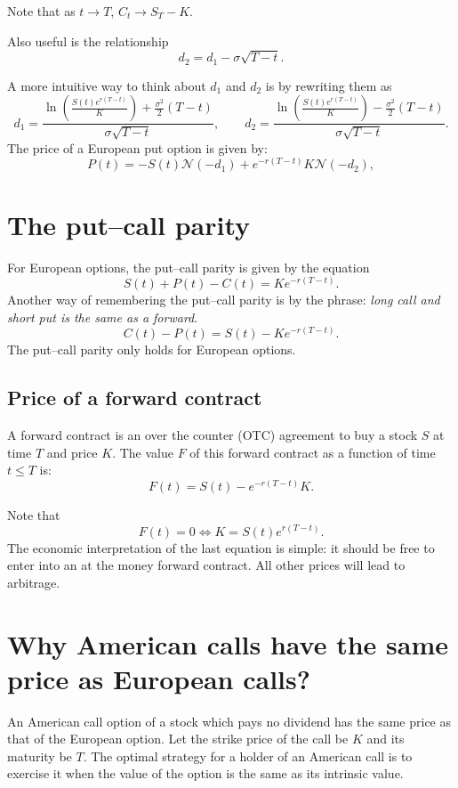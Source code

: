 \documentclass{amsart}
\theoremstyle{plain}
\numberwithin{equation}{section}
\begin{document}
Note that as $t \to T$, $C_t \to S_T - K$. 

Also useful is the relationship
\begin{equation}
d_2 = d_1 - \sigma \sqrt{T-t}.
\end{equation}

A more intuitive way to think about $d_1$ and 
$d_2$ is by rewriting them as
\begin{equation}
d_1 = \frac{\ln\left(\frac{S(t) e^{r(T-t)}}{K}\right) + 
\frac{\sigma^2}{2}(T-t)}{\sigma \sqrt{T-t}}, \qquad 
d_2 = \frac{\ln\left(\frac{S(t) e^{r(T-t)}}{K}\right) - \frac{\sigma^2}{2}(T-t)}{\sigma \sqrt{T-t}}.
\end{equation}
The price of a European put option is given by:
\begin{equation}
P(t) = -S(t) \mathcal{N} (-d_1) + e^{-r(T-t)} K \mathcal{N} (-d_2),
\end{equation}
\section*{The put--call parity}
For European options, the put--call
parity is given by the equation
\begin{equation}
S(t) + P(t) - C(t) = K e^{-r(T-t)}.
\end{equation}
Another way of remembering the put--call parity is by the 
phrase: 
\emph{long call and short put is the same as a forward}.
\begin{equation}
C(t) - P(t) = S(t) - K e^{-r(T-t)}.
\end{equation}
The put--call parity only holds for European options. 
\subsection{Price of a forward contract}
A forward contract is an over the counter (OTC) 
agreement to buy a stock $S$ at time $T$
and price $K$. The value $F$ of this forward 
contract as a function of time $t \leq T$ is:
\begin{equation}
F(t) = S(t) - e^{-r(T-t)}K.
\end{equation}

Note that 
\begin{equation*}
F(t)=0 \iff K = S(t) e^{r(T-t)}.
\end{equation*}
The economic interpretation of the last 
equation is simple: it should be free to 
enter into an at the money forward 
contract. All other prices will lead
to arbitrage. 

\section*{Why American calls have the same price as European calls?}
An American call option of a stock which pays no dividend has the same price 
as that of the European option. Let the strike price of the call be $K$ and its maturity be $T$. 
The optimal strategy for a holder of an American call is to exercise it when the value of the 
option is the same as its intrinsic value. 
\end{document}
